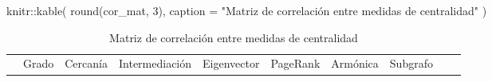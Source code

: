 \documentclass[
  letterpaper,
  DIV=11,
  numbers=noendperiod]{scrreprt}
\newenvironment{Shaded}{\begin{snugshade}}{\end{snugshade}}
\newcommand{\AttributeTok}[1]{\textcolor[rgb]{0.40,0.45,0.13}{#1}}
\newcommand{\DecValTok}[1]{\textcolor[rgb]{0.68,0.00,0.00}{#1}}
\newcommand{\FunctionTok}[1]{\textcolor[rgb]{0.28,0.35,0.67}{#1}}
\newcommand{\NormalTok}[1]{\textcolor[rgb]{0.00,0.23,0.31}{#1}}
\newcommand{\SpecialCharTok}[1]{\textcolor[rgb]{0.37,0.37,0.37}{#1}}
\newcommand{\StringTok}[1]{\textcolor[rgb]{0.13,0.47,0.30}{#1}}
\begin{document}
\begin{Shaded}
\begin{Highlighting}[]
\NormalTok{knitr}\SpecialCharTok{::}\FunctionTok{kable}\NormalTok{(}
  \FunctionTok{round}\NormalTok{(cor\_mat, }\DecValTok{3}\NormalTok{),}
  \AttributeTok{caption =} \StringTok{"Matriz de correlación entre medidas de centralidad"}
\NormalTok{)}
\end{Highlighting}
\end{Shaded}

\begin{longtable}[]{@{}
  >{\raggedright\arraybackslash}p{}
  >{\raggedleft\arraybackslash}p{}
  >{\raggedleft\arraybackslash}p{}
  >{\raggedleft\arraybackslash}p{}
  >{\raggedleft\arraybackslash}p{}
  >{\raggedleft\arraybackslash}p{}
  >{\raggedleft\arraybackslash}p{}
  >{\raggedleft\arraybackslash}p{}
  >{\raggedleft\arraybackslash}p{}
  >{\raggedleft\arraybackslash}p{}@{}}
\caption{Matriz de correlación entre medidas de
centralidad}\tabularnewline
\toprule\noalign{}
\begin{minipage}[b]{\linewidth}\raggedright
\end{minipage} & \begin{minipage}[b]{\linewidth}\raggedleft
Grado
\end{minipage} & \begin{minipage}[b]{\linewidth}\raggedleft
Cercanía
\end{minipage} & \begin{minipage}[b]{\linewidth}\raggedleft
Intermediación
\end{minipage} & \begin{minipage}[b]{\linewidth}\raggedleft
Eigenvector
\end{minipage} & \begin{minipage}[b]{\linewidth}\raggedleft
PageRank
\end{minipage} & \begin{minipage}[b]{\linewidth}\raggedleft
Armónica
\end{minipage} & \begin{minipage}[b]{\linewidth}\raggedleft
Subgrafo
\end{minipage} & \begin{minipage}[b]{\linewidth}\raggedleft

\end{minipage}
\end{longtable}
\end{document}
